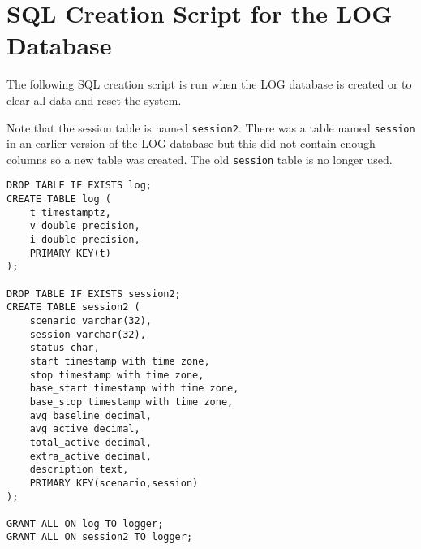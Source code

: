 \chapter{SQL Creation Script for the LOG Database}
\label{appendix:database}

The following SQL creation script is run when the LOG database is created or to clear all data and reset the system.

Note that the session table is named \verb!session2!. There was a table named \verb!session! in an earlier version of the LOG database but this did not contain enough columns so a new table was created. The old  \verb!session! table is no longer used.

\begin{verbatim}
DROP TABLE IF EXISTS log;
CREATE TABLE log (
    t timestamptz,
    v double precision,
    i double precision,
    PRIMARY KEY(t)
);

DROP TABLE IF EXISTS session2;
CREATE TABLE session2 (
    scenario varchar(32),
    session varchar(32),
    status char,
    start timestamp with time zone,
    stop timestamp with time zone,
    base_start timestamp with time zone,
    base_stop timestamp with time zone,
    avg_baseline decimal,
    avg_active decimal,
    total_active decimal,
    extra_active decimal,
    description text,
    PRIMARY KEY(scenario,session)
);

GRANT ALL ON log TO logger;
GRANT ALL ON session2 TO logger;
\end{verbatim}
